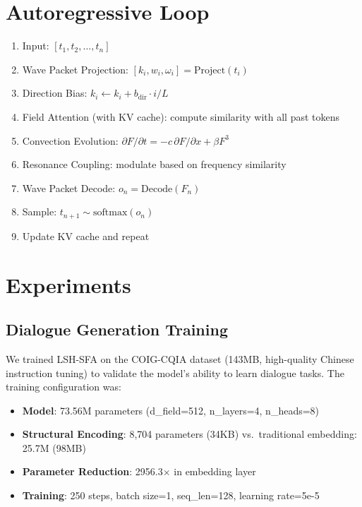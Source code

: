 \documentclass{article}
\begin{document}
\section{Autoregressive Loop}

\begin{enumerate}
\item Input: $[t_1, t_2, \ldots, t_n]$
\item Wave Packet Projection: $[k_i, w_i, \omega_i] = \text{Project}(t_i)$
\item Direction Bias: $k_i \leftarrow k_i + b_{\text{dir}} \cdot i/L$
\item Field Attention (with KV cache): compute similarity with all past tokens
\item Convection Evolution: $\partial F/\partial t = -c\,\partial F/\partial x + \beta F^3$
\item Resonance Coupling: modulate based on frequency similarity
\item Wave Packet Decode: $o_n = \text{Decode}(F_n)$
\item Sample: $t_{n+1} \sim \text{softmax}(o_n)$
\item Update KV cache and repeat
\end{enumerate}

\section{Experiments}

\subsection{Dialogue Generation Training}

We trained LSH-SFA on the COIG-CQIA dataset (143MB, high-quality Chinese instruction tuning) to validate the model's ability to learn dialogue tasks. The training configuration was:

\begin{itemize}
\item \textbf{Model}: 73.56M parameters (d\_field=512, n\_layers=4, n\_heads=8)
\item \textbf{Structural Encoding}: 8,704 parameters (34KB) vs.\ traditional embedding: 25.7M (98MB)
\item \textbf{Parameter Reduction}: 2956.3$\times$ in embedding layer
\item \textbf{Training}: 250 steps, batch size=1, seq\_len=128, learning rate=5e-5
\end{itemize}
\end{document}
